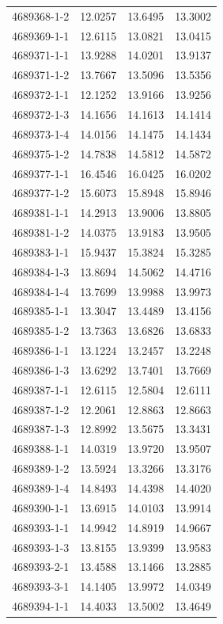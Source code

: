 \begin{longtable}{lrrr}
4689368-1-2 & 12.0257 & 13.6495 & 13.3002 \\
4689369-1-1 & 12.6115 & 13.0821 & 13.0415 \\
4689371-1-1 & 13.9288 & 14.0201 & 13.9137 \\
4689371-1-2 & 13.7667 & 13.5096 & 13.5356 \\
4689372-1-1 & 12.1252 & 13.9166 & 13.9256 \\
4689372-1-3 & 14.1656 & 14.1613 & 14.1414 \\
4689373-1-4 & 14.0156 & 14.1475 & 14.1434 \\
4689375-1-2 & 14.7838 & 14.5812 & 14.5872 \\
4689377-1-1 & 16.4546 & 16.0425 & 16.0202 \\
4689377-1-2 & 15.6073 & 15.8948 & 15.8946 \\
4689381-1-1 & 14.2913 & 13.9006 & 13.8805 \\
4689381-1-2 & 14.0375 & 13.9183 & 13.9505 \\
4689383-1-1 & 15.9437 & 15.3824 & 15.3285 \\
4689384-1-3 & 13.8694 & 14.5062 & 14.4716 \\
4689384-1-4 & 13.7699 & 13.9988 & 13.9973 \\
4689385-1-1 & 13.3047 & 13.4489 & 13.4156 \\
4689385-1-2 & 13.7363 & 13.6826 & 13.6833 \\
4689386-1-1 & 13.1224 & 13.2457 & 13.2248 \\
4689386-1-3 & 13.6292 & 13.7401 & 13.7669 \\
4689387-1-1 & 12.6115 & 12.5804 & 12.6111 \\
4689387-1-2 & 12.2061 & 12.8863 & 12.8663 \\
4689387-1-3 & 12.8992 & 13.5675 & 13.3431 \\
4689388-1-1 & 14.0319 & 13.9720 & 13.9507 \\
4689389-1-2 & 13.5924 & 13.3266 & 13.3176 \\
4689389-1-4 & 14.8493 & 14.4398 & 14.4020 \\
4689390-1-1 & 13.6915 & 14.0103 & 13.9914 \\
4689393-1-1 & 14.9942 & 14.8919 & 14.9667 \\
4689393-1-3 & 13.8155 & 13.9399 & 13.9583 \\
4689393-2-1 & 13.4588 & 13.1466 & 13.2885 \\
4689393-3-1 & 14.1405 & 13.9972 & 14.0349 \\
4689394-1-1 & 14.4033 & 13.5002 & 13.4649 \\

\end{longtable}
